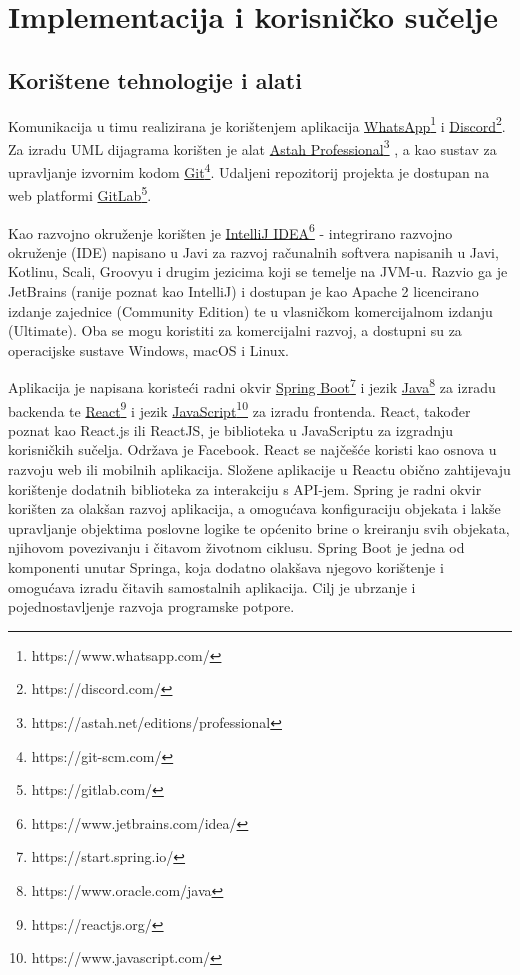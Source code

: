 \chapter{Implementacija i korisničko sučelje}
		
		
		\section{Korištene tehnologije i alati}
			
			 Komunikacija u timu realizirana je korištenjem aplikacija \underline{WhatsApp}\footnote{https://www.whatsapp.com/} i \underline{Discord}\footnote{https://discord.com/}. Za izradu UML dijagrama korišten je alat \underline{Astah Professional}\footnote{https://astah.net/editions/professional} , a kao sustav za upravljanje izvornim kodom \underline{Git}\footnote{https://git-scm.com/}. Udaljeni repozitorij projekta je dostupan na web platformi \underline{GitLab}\footnote{https://gitlab.com/}.
			 
			 Kao razvojno okruženje korišten je \underline{IntelliJ IDEA}\footnote{https://www.jetbrains.com/idea/} - integrirano razvojno okruženje (IDE) napisano u Javi za razvoj računalnih softvera napisanih u Javi, Kotlinu, Scali, Groovyu i drugim jezicima koji se temelje na JVM-u. Razvio ga je JetBrains (ranije poznat kao IntelliJ) i dostupan je kao Apache 2 licencirano izdanje zajednice (Community Edition) te u vlasničkom komercijalnom izdanju (Ultimate). Oba se mogu koristiti za komercijalni razvoj, a dostupni su za operacijske sustave Windows, macOS i Linux.
			 
			 Aplikacija je napisana koristeći radni okvir \underline{Spring Boot}\footnote{https://start.spring.io/} i jezik \underline{Java}\footnote{https://www.oracle.com/java} za izradu backenda te \underline{React}\footnote{https://reactjs.org/} i jezik \underline{JavaScript}\footnote{https://www.javascript.com/} za izradu frontenda. React, također poznat kao React.js ili ReactJS, je biblioteka u JavaScriptu za izgradnju korisničkih sučelja. Održava je Facebook. React se najčešće koristi kao osnova u razvoju web ili mobilnih aplikacija. Složene aplikacije u Reactu obično zahtijevaju korištenje dodatnih biblioteka za interakciju s API-jem. Spring je radni okvir korišten za olakšan razvoj aplikacija, a omogućava konfiguraciju objekata i lakše upravljanje objektima poslovne logike te općenito brine o kreiranju svih objekata, njihovom povezivanju i čitavom životnom ciklusu. Spring Boot je jedna od komponenti unutar Springa, koja dodatno olakšava njegovo korištenje i omogućava izradu čitavih samostalnih aplikacija. Cilj je ubrzanje i pojednostavljenje razvoja programske potpore.
			 
